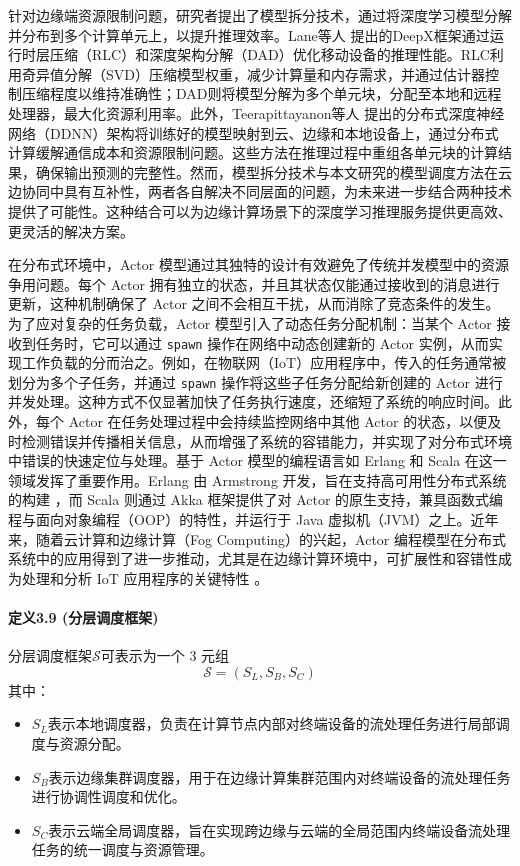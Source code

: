 针对边缘端资源限制问题，研究者提出了模型拆分技术，通过将深度学习模型分解并分布到多个计算单元上，以提升推理效率。Lane等人\cite{lane2016deepx} 提出的DeepX框架通过运行时层压缩（RLC）和深度架构分解（DAD）优化移动设备的推理性能。RLC利用奇异值分解（SVD）压缩模型权重，减少计算量和内存需求，并通过估计器控制压缩程度以维持准确性；DAD则将模型分解为多个单元块，分配至本地和远程处理器，最大化资源利用率。此外，Teerapittayanon等人\cite{teerapittayanon2017distributed} 提出的分布式深度神经网络（DDNN）架构将训练好的模型映射到云、边缘和本地设备上，通过分布式计算缓解通信成本和资源限制问题。这些方法在推理过程中重组各单元块的计算结果，确保输出预测的完整性。然而，模型拆分技术与本文研究的模型调度方法在云边协同中具有互补性，两者各自解决不同层面的问题，为未来进一步结合两种技术提供了可能性。这种结合可以为边缘计算场景下的深度学习推理服务提供更高效、更灵活的解决方案。



在分布式环境中，Actor 模型通过其独特的设计有效避免了传统并发模型中的资源争用问题。每个 Actor 拥有独立的状态，并且其状态仅能通过接收到的消息进行更新，这种机制确保了 Actor 之间不会相互干扰，从而消除了竞态条件的发生。为了应对复杂的任务负载，Actor 模型引入了动态任务分配机制：当某个 Actor 接收到任务时，它可以通过 \texttt{spawn} 操作在网络中动态创建新的 Actor 实例，从而实现工作负载的分而治之。例如，在物联网（IoT）应用程序中，传入的任务通常被划分为多个子任务，并通过 \texttt{spawn} 操作将这些子任务分配给新创建的 Actor 进行并发处理。这种方式不仅显著加快了任务执行速度，还缩短了系统的响应时间。此外，每个 Actor 在任务处理过程中会持续监控网络中其他 Actor 的状态，以便及时检测错误并传播相关信息，从而增强了系统的容错能力，并实现了对分布式环境中错误的快速定位与处理。基于 Actor 模型的编程语言如 Erlang 和 Scala 在这一领域发挥了重要作用。Erlang 由 Armstrong 开发，旨在支持高可用性分布式系统的构建 \cite{armstrong2007history}，而 Scala 则通过 Akka 框架提供了对 Actor 的原生支持，兼具函数式编程与面向对象编程（OOP）的特性，并运行于 Java 虚拟机（JVM）之上。近年来，随着云计算和边缘计算（Fog Computing）的兴起，Actor 编程模型在分布式系统中的应用得到了进一步推动，尤其是在边缘计算环境中，可扩展性和容错性成为处理和分析 IoT 应用程序的关键特性 \cite{srirama2021akka}。


\paragraph{定义3.9 (分层调度框架)} 分层调度框架$\mathcal{S}$可表示为一个 3 元组
\[
\mathcal{S} = (S_L, S_B, S_C)
\]
其中：
\begin{itemize}
    \item $S_L$表示本地调度器，负责在计算节点内部对终端设备的流处理任务进行局部调度与资源分配。
    \item $S_B$表示边缘集群调度器，用于在边缘计算集群范围内对终端设备的流处理任务进行协调性调度和优化。
    \item $S_C$表示云端全局调度器，旨在实现跨边缘与云端的全局范围内终端设备流处理任务的统一调度与资源管理。
\end{itemize}


